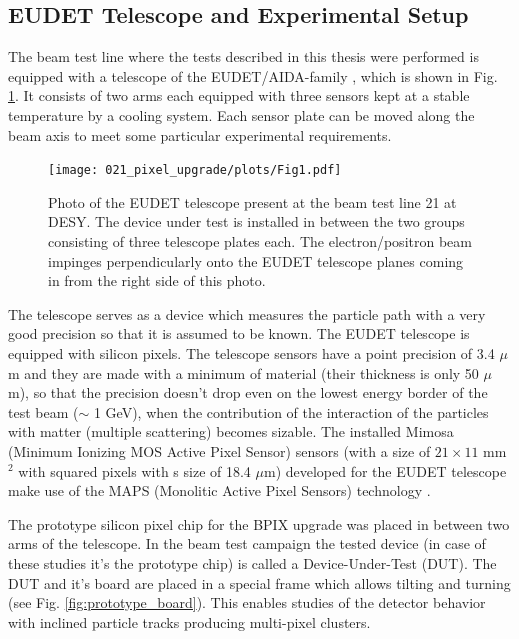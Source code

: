 \subsection{EUDET Telescope and Experimental Setup} 

The beam test line where the tests described in this thesis were performed is equipped with a telescope of the EUDET/AIDA-family \cite{EUDET},
which is shown in Fig. \ref{fig:EUDET_tel}. It consists of two arms each equipped with three sensors kept at a stable temperature by a cooling
system. Each sensor plate can be moved along the beam axis to meet some particular experimental requirements.

\begin{figure}[t]
 \centering
 \texttt{[image: 021\_pixel\_upgrade/plots/Fig1.pdf]}
 \caption{Photo of the EUDET telescope present at the beam test line 21 at DESY. The device under test is installed in between the two
 groups consisting of three telescope plates each. The electron/positron beam impinges perpendicularly onto the EUDET telescope planes 
 coming in from the right side of this photo.}
 \label{fig:EUDET_tel}
\end{figure}

The telescope serves as a device which measures the particle path with a very good precision so that it is assumed to be known.
The EUDET telescope is equipped with silicon pixels. The telescope sensors have a point precision of 3.4 $\mu$m and they
are made with a minimum of material (their thickness is only 50 $\mu$m), so that the precision doesn't drop even on the lowest 
energy border of the test beam ($\sim$ 1 GeV), when the contribution of the interaction of the particles with matter (multiple
scattering) becomes sizable. The installed Mimosa (Minimum Ionizing MOS Active Pixel Sensor) sensors (with a size of 
$21 \times 11$ mm$^{2}$ with squared pixels with s size of 18.4 $\mu$m) developed for the EUDET telescope make use of the MAPS 
(Monolitic Active Pixel Sensors) technology \cite{2001NIMPA.458..677T, Fischer:2002bv}.

The prototype silicon pixel chip for the BPIX upgrade was placed in between two arms of the telescope. In the beam test 
campaign the tested device (in case of these studies it's the prototype chip) is called a Device-Under-Test (DUT). The DUT
and it's board are placed in a special frame which allows tilting and turning (see Fig. \ref{fig:prototype_board}). 
This enables studies of the detector behavior with inclined particle tracks producing multi-pixel clusters. 

